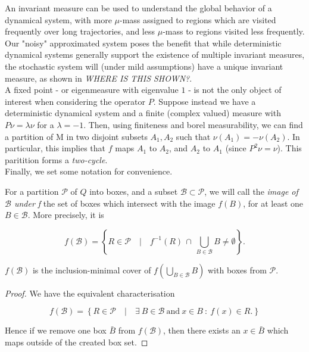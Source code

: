 An invariant measure can be used to understand the global behavior of a dynamical 
system, with more $\mu$-mass assigned to regions which are visited frequently over long
trajectories, and less $\mu$-mass to regions visited less frequently. \\

Our "noisy" approximated system poses the benefit that while deterministic dynamical systems 
generally support the existence of multiple invariant measures, the stochastic system will 
(under mild assumptions) have a unique invariant measure, as shown in \emph{WHERE IS THIS SHOWN?}. \\

A fixed point - or eigenmeasure with eigenvalue $1$ - is not the only object of interest 
when considering the operator $P$. Suppose instead we have a deterministic dynamical system
and a finite (complex valued) measure with $P \nu = \lambda \nu$ for a $\lambda = -1$. Then, 
using finiteness and borel measurability, we can find a partition of M in two disjoint subsets 
$A_1, A_2$ such that $\nu (A_1) = - \nu (A_2)$. In particular, this implies that $f$ maps 
$A_1$ to $A_2$, and $A_2$ to $A_1$ (since $P^2 \nu = \nu$). This paritition forms a 
\emph{two-cycle}. \\

Finally, we set some notation for convenience.

\begin{definition}
    For a partition $\mathcal{P}$ of $Q$ into boxes, and a subset 
    $\mathcal{B} \subset \mathcal{P}$, we will call the \emph{image of $\mathcal{B}$ under f} 
    the set of boxes which intersect with the image $f(B)$, for at least one 
    $B \in \mathcal{B}$. More precisely, it is 
    
    \begin{equation}
        f (\mathcal{B}) = \left\{
            R \in \mathcal{P} \quad \vert \quad 
            f^{-1} (R)\, \cap\, \bigcup\limits_{B \in \mathcal{B}} B \neq \emptyset
        \right\}.
    \end{equation}

\end{definition}

\begin{theorem}
    $f(\mathcal{B})$ is the inclusion-minimal cover of $f(\bigcup_{B \in \mathcal{B}} B)$
    with boxes from $\mathcal{P}$.
\end{theorem}

\begin{proof}
    We have the equivalent characterisation

    \begin{equation}
        f(\mathcal{B}) = \left\{
            R \in \mathcal{P} \quad \vert \quad
            \exists\ B \in \mathcal{B}\ \text{and}\ x \in B\ :\ f(x) \in R.
        \right\}
    \end{equation}

    Hence if we remove one box $\bar{B}$ from $f(\mathcal{B})$, then there exists an 
    $x \in \bar{B}$ which maps outside of the created box set.

\end{proof}
